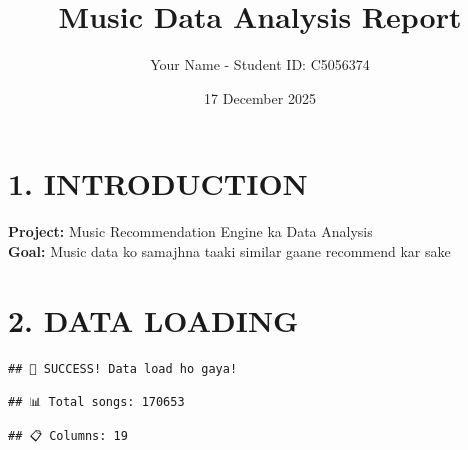 \documentclass[
]{article}
\title{Music Data Analysis Report}
\author{Your Name - Student ID: C5056374}
\date{17 December 2025}
\begin{document}
\maketitle

\section{1. INTRODUCTION}\label{introduction}

\textbf{Project:} Music Recommendation Engine ka Data Analysis\\
\textbf{Goal:} Music data ko samajhna taaki similar gaane recommend kar
sake

\section{2. DATA LOADING}\label{data-loading}

\begin{verbatim}
## 🎵 SUCCESS! Data load ho gaya!
\end{verbatim}

\begin{verbatim}
## 📊 Total songs: 170653
\end{verbatim}

\begin{verbatim}
## 📋 Columns: 19
\end{verbatim}
\end{document}
